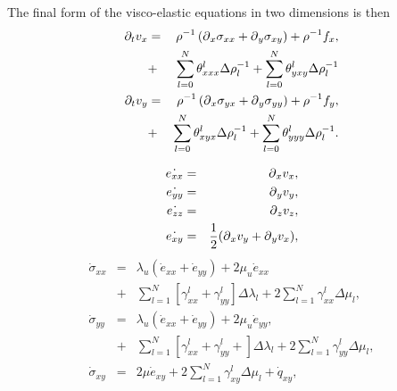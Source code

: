 \documentclass[11pt]{article}
\begin{document}
The final form of the visco-elastic equations in two dimensions is then
\begin{eqnarray}
  \partial_t{v}_x 
     & = & \rho^{-1}\left(\mbox{$\partial$}_x \sigma_{xx} +\mbox{$\partial$}_y
           \sigma_{xy} \right) + \rho^{-1}f_x,       \nonumber\\
     & + & \sum_{l=0}^N\theta^l_{xxx}\Delta\rho^{-1}_{l} 
           +  \sum_{l=0}^N\theta^l_{yxy}\Delta\rho^{-1}_{l} 
           \nonumber\\ 
  \partial_t{v}_y 
     & = & \rho^{-1}\left(\mbox{$\partial$}_x \sigma_{yx} +\mbox{$\partial$}_y 
           \sigma_{yy}\right)  + \rho^{-1}f_y,                      \nonumber\\                 
     & + & \sum_{l=0}^N\theta^l_{xyx}\Delta\rho^{-1}_{l} 
           +  \sum_{l=0}^N\theta^l_{yyy}\Delta\rho^{-1}_{l} 
           .\nonumber\\ 
\end{eqnarray}

\begin{eqnarray}
    \dot{e_{xx}} & = & \mbox{$\partial$}_x v_x, \nonumber\\
    \dot{e_{yy}} & = & \mbox{$\partial$}_y v_y, \nonumber\\
    \dot{e_{zz}} & = & \mbox{$\partial$}_z v_z, \nonumber\\
    \dot{e_{xy}} & = & \frac{1}{2}(\mbox{$\partial$}_x v_y + \mbox{$\partial$}_y v_x),\nonumber\\
\end{eqnarray}
\begin{eqnarray}
  \dot{\sigma}_{xx} 
    & = & \lambda_u \left (\dot{e}_{xx} + \dot{e}_{yy} \right)
         + 2\mu_u \dot{e}_{xx}                                \nonumber\\
    & + & \sum_{l=1}^N\left[\gamma^l_{xx}
                           +\gamma^l_{yy}\right]\Delta\lambda_l
         + 2\sum_{l=1}^N\gamma^l_{xx}\Delta\mu_l,            \nonumber\\
  \dot{\sigma}_{yy} 
    & = & \lambda_u 
         \left (\dot{e}_{xx} + \dot{e}_{yy} \right)
         + 2\mu_u \dot{e}_{yy},                     \nonumber\\
    & + & \sum_{l=1}^N\left[\gamma^l_{xx}+\gamma^l_{yy} +
                             \right] \Delta\lambda_l  
         + 2\sum_{l=1}^N\gamma^l_{yy}\Delta\mu_l,                 \nonumber\\
  \dot{\sigma}_{xy} 
    & = & 2\mu \dot{e}_{xy} + 2\sum_{l=1}^N\gamma^l_{xy}
          \Delta\mu_l+\dot{q}_{xy}                                \nonumber,\\
\end{eqnarray} 
\end{document}
